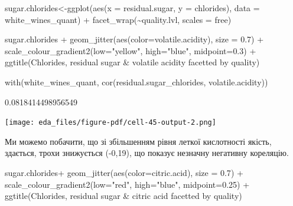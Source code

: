 \documentclass[
  letterpaper,
  DIV=11,
  numbers=noendperiod]{scrreprt}
\newenvironment{Shaded}{\begin{snugshade}}{\end{snugshade}}
\newcommand{\AttributeTok}[1]{\textcolor[rgb]{0.40,0.45,0.13}{#1}}
\newcommand{\FloatTok}[1]{\textcolor[rgb]{0.68,0.00,0.00}{#1}}
\newcommand{\FunctionTok}[1]{\textcolor[rgb]{0.28,0.35,0.67}{#1}}
\newcommand{\NormalTok}[1]{\textcolor[rgb]{0.00,0.23,0.31}{#1}}
\newcommand{\OtherTok}[1]{\textcolor[rgb]{0.00,0.23,0.31}{#1}}
\newcommand{\SpecialCharTok}[1]{\textcolor[rgb]{0.37,0.37,0.37}{#1}}
\newcommand{\StringTok}[1]{\textcolor[rgb]{0.13,0.47,0.30}{#1}}
\begin{document}
\begin{Shaded}
\begin{Highlighting}[]
\NormalTok{sugar.chlorides}\OtherTok{\textless{}{-}}\FunctionTok{ggplot}\NormalTok{(}\FunctionTok{aes}\NormalTok{(}\AttributeTok{x =}\NormalTok{ residual.sugar, }\AttributeTok{y =}\NormalTok{ chlorides), }
                        \AttributeTok{data =}\NormalTok{ white\_wines\_quant) }\SpecialCharTok{+}
  \FunctionTok{facet\_wrap}\NormalTok{(}\SpecialCharTok{\textasciitilde{}}\NormalTok{quality.lvl, }\AttributeTok{scales =} \StringTok{\textquotesingle{}free\textquotesingle{}}\NormalTok{)}

\NormalTok{sugar.chlorides }\SpecialCharTok{+}
  \FunctionTok{geom\_jitter}\NormalTok{(}\FunctionTok{aes}\NormalTok{(}\AttributeTok{color=}\NormalTok{volatile.acidity), }\AttributeTok{size =} \FloatTok{0.7}\NormalTok{) }\SpecialCharTok{+}
  \FunctionTok{scale\_colour\_gradient2}\NormalTok{(}\AttributeTok{low=}\StringTok{"yellow"}\NormalTok{, }\AttributeTok{high=}\StringTok{"blue"}\NormalTok{, }\AttributeTok{midpoint=}\FloatTok{0.3}\NormalTok{) }\SpecialCharTok{+}
  \FunctionTok{ggtitle}\NormalTok{(}\StringTok{\textquotesingle{}Chlorides, residual sugar \& volatile acidity facetted by quality\textquotesingle{}}\NormalTok{)}

\FunctionTok{with}\NormalTok{(white\_wines\_quant, }\FunctionTok{cor}\NormalTok{(residual.sugar\_chlorides, volatile.acidity))}
\end{Highlighting}
\end{Shaded}

0.0818414498956549

\texttt{[image: eda\_files/figure-pdf/cell-45-output-2.png]}

Ми можемо побачити, що зі збільшенням рівня леткої кислотності якість,
здається, трохи знижується (-0,19), що показує незначну негативну
кореляцію.

\begin{Shaded}
\begin{Highlighting}[]
\NormalTok{sugar.chlorides}\SpecialCharTok{+}
  \FunctionTok{geom\_jitter}\NormalTok{(}\FunctionTok{aes}\NormalTok{(}\AttributeTok{color=}\NormalTok{citric.acid), }\AttributeTok{size =} \FloatTok{0.7}\NormalTok{) }\SpecialCharTok{+}
  \FunctionTok{scale\_colour\_gradient2}\NormalTok{(}\AttributeTok{low=}\StringTok{"red"}\NormalTok{, }\AttributeTok{high=}\StringTok{"blue"}\NormalTok{, }\AttributeTok{midpoint=}\FloatTok{0.25}\NormalTok{) }\SpecialCharTok{+}
  \FunctionTok{ggtitle}\NormalTok{(}\StringTok{\textquotesingle{}Chlorides, residual sugar \& citric acid facetted by quality\textquotesingle{}}\NormalTok{)}
\end{Highlighting}
\end{Shaded}
\end{document}
